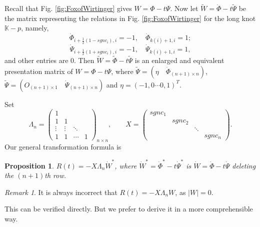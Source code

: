 \documentclass{amsart}
\newtheorem{prop}[thm]{Proposition}
\theoremstyle{definition}
\theoremstyle{remark}
\newtheorem{rem}[thm]{Remark}
\numberwithin{equation}{subsection}
\begin{document}
Recall that Fig. \ref{fig:FoxofWirtinger} gives $W = \Phi - t\Psi$. Now let $\tilde{W} = \dot{\Phi} - t\tilde{\Psi}$ be the matrix representing the relations in Fig. \ref{fig:FoxofWirtinger} for the long knot $\mathbb{K} - p$, namely,
\[
\dot{\Phi}_{i+\frac{1}{2}(1-sgnc_{i}),i } = -1, \quad \dot{\Phi}_{k(i)+1,i} = 1;
\]
\[
\dot{\Psi}_{i+\frac{1}{2}(1+sgnc_{i}),i } = -1, \quad \dot{\Psi}_{k(i)+1,i} = 1,
\]
and other entries are $0$. 
Then $\tilde{W} = \tilde{\Phi} - t\tilde{\Psi}$ is an enlarged and equivalent presentation matrix of $W = \Phi - t\Psi$, where $\tilde{\Psi} = \left(\eta \quad \dot{\Phi}_{(n+1) \times n}\right)$, $\tilde{\Psi} = \left(O_{(n+1) \times 1} \quad \dot{\Psi}_{(n+1) \times n}\right)$ and $\eta = (-1,0 \cdots 0,1)^{T}$.

Set
\[
\Lambda_{n} = \begin{pmatrix}
1 & & & \\
1 & 1 & & \\
\vdots & \vdots & \ddots & \\
1 & 1 & \cdots & 1
\end{pmatrix}_{n \times n}, \qquad X = \begin{pmatrix}
sgnc_{1} & & & \\
& sgnc_{2} & & \\
& & \ddots & \\
& & & sgnc_{n}
\end{pmatrix}.
\]
Our general transformation formula is 
\begin{prop}\label{prop:relation with  Wirtinger}
$R(t) = -X\Lambda_{n}\dot{W}^{*}$, where $\dot{W}^{*} = \dot{\Phi}^{*} - t\dot{\Psi}^{*}$ is $\dot{W} = \dot{\Phi} - t\dot{\Psi}$ deleting the $(n+1)$th row.
\end{prop}

\begin{rem}
It is always incorrect that $R(t) = -X\Lambda_{n}W$, as $|W| = 0$.
\end{rem}

This can be verified directly. But we prefer to derive it in a more comprehensible way.
\end{document}
